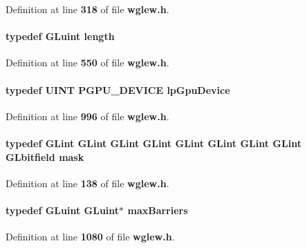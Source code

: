 Definition at line {\bf 318} of file {\bf wglew.\+h}.

\paragraph[{length}]{\setlength{\rightskip}{0pt plus 5cm}typedef {\bf G\+Luint} {\bf length}}\label{wglew_8h_a74efbdef71b2e5711088ae39fc925d2d}


Definition at line {\bf 550} of file {\bf wglew.\+h}.

\paragraph[{lp\+Gpu\+Device}]{\setlength{\rightskip}{0pt plus 5cm}typedef {\bf U\+I\+NT} {\bf P\+G\+P\+U\+\_\+\+D\+E\+V\+I\+CE} {\bf lp\+Gpu\+Device}}\label{wglew_8h_aa898d12612a2f5da1fc1158350c862d0}


Definition at line {\bf 996} of file {\bf wglew.\+h}.

\paragraph[{mask}]{\setlength{\rightskip}{0pt plus 5cm}typedef {\bf G\+Lint} {\bf G\+Lint} {\bf G\+Lint} {\bf G\+Lint} {\bf G\+Lint} {\bf G\+Lint} {\bf G\+Lint} {\bf G\+Lint} {\bf G\+Lbitfield} {\bf mask}}\label{wglew_8h_ac96012c186757f49c8d39675cd43a4e4}


Definition at line {\bf 138} of file {\bf wglew.\+h}.

\paragraph[{max\+Barriers}]{\setlength{\rightskip}{0pt plus 5cm}typedef {\bf G\+Luint} {\bf G\+Luint}$\ast$ {\bf max\+Barriers}}\label{wglew_8h_a97112cce661fcb78de40e65a6d9230a6}


Definition at line {\bf 1080} of file {\bf wglew.\+h}.

